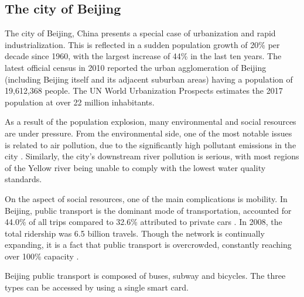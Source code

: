 \documentclass{article}
\begin{document}
\subsection{The city of Beijing}
The city of Beijing, China presents a special case of urbanization and rapid industrialization. This is reflected in a sudden population growth of 20\% per decade since 1960, with the largest increase of 44\% in the last ten years. The latest official census in 2010 reported the urban agglomeration of Beijing (including Beijing itself and its adjacent suburban areas) having a population of 19,612,368 people. The UN World Urbanization Prospects estimates the 2017 population at over 22 million inhabitants. \cite{world2016beijing}

As a result of the population explosion, many environmental and social resources are under pressure. From the environmental side, one of the most notable issues is related to air pollution, due to the significantly high pollutant emissions in the city \cite{zhang2016air}. Similarly, the city's downstream river pollution is serious, with most regions of the Yellow river being unable to comply with the lowest water quality standards. \cite{wang2015studies} 

On the aspect of social resources, one of the main complications is mobility. In Beijing, public transport is the dominant mode of transportation, accounted for 44.0\% of all trips compared to 32.6\% attributed to private cars \cite{mao2016commuting}. In 2008, the total ridership was 6.5 billion travels. Though the network is continually expanding, it is a fact that public transport is overcrowded, constantly reaching over 100\% capacity \cite{beijing2009research}.

Beijing public transport is composed of buses, subway and bicycles. The three types can be accessed by using a single smart card. 
\end{document}
